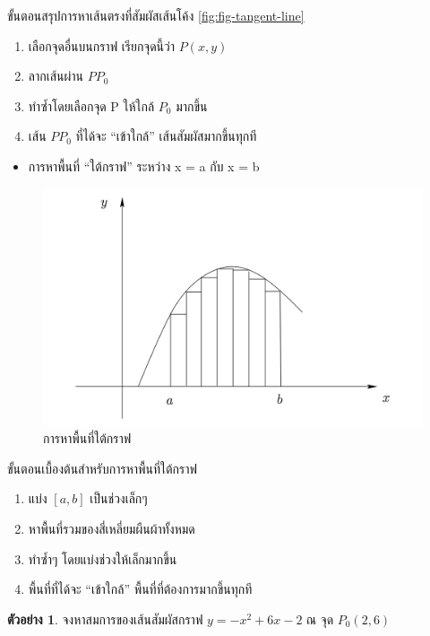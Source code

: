 \documentclass[
]{book}
\providecommand{\tightlist}{%
  \setlength{\itemsep}{0pt}\setlength{\parskip}{0pt}}
\theoremstyle{definition}
\theoremstyle{definition}
\newtheorem{example}{ตัวอย่าง}[chapter]
\theoremstyle{definition}
\theoremstyle{definition}
\theoremstyle{remark}
\begin{document}
ขั้นตอนสรุปการหาเส้นตรงที่สัมผัสเส้นโค้ง \ref{fig:fig-tangent-line}

\begin{enumerate}
\def\labelenumi{\arabic{enumi}.}
\item
  เลือกจุดอื่นบนกราฟ เรียกจุดนี้ว่า \(P(x,y)\)
\item
  ลากเส้นผ่าน \(PP_{0}\)
\item
  ทำซ้ำโดยเลือกจุด P ให้ใกล้ \(P_{0}\) มากขึ้น
\item
  เส้น \(PP_{0}\) ที่ได้จะ ``เข้าใกล้'' เส้นสัมผัสมากขึ้นทุกที
\end{enumerate}

\begin{itemize}
\tightlist
\item
  การหาพื้นที่ ``ใต้กราฟ'' ระหว่าง x = a กับ x = b
\end{itemize}

\begin{figure}

{\centering \includegraphics[width=0.5\linewidth]{images/fig-area-under-curve} 

}

\caption{การหาพื้นที่ใต้กราฟ}\label{fig:fig-area-under-curve}
\end{figure}

ขั้นตอนเบื้องต้นสำหรับการหาพื้นที่ใต้กราฟ

\begin{enumerate}
\def\labelenumi{\arabic{enumi}.}
\tightlist
\item
  แบ่ง \([a,b]\) เป็นช่วงเล็กๆ
\item
  หาพื้นที่รวมของสี่เหลี่ยมผืนผ้าทั้งหมด
\item
  ทำซ้ำๆ โดยแบ่งช่วงให้เล็กมากขึ้น
\item
  พื้นที่ที่ได้จะ ``เข้าใกล้'' พื้นที่ที่ต้องการมากขึ้นทุกที
\end{enumerate}

\begin{example}
\protect\hypertarget{exm:ex-limit-1}{}\label{exm:ex-limit-1}จงหาสมการของเส้นสัมผัสกราฟ \(y=-x^{2}+6x-2\) ณ จุด \(P_{0}(2,6)\)
\end{example}
\end{document}
